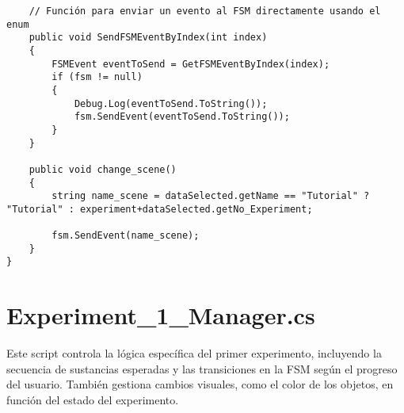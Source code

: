\begin{verbatim}
    // Función para enviar un evento al FSM directamente usando el enum
    public void SendFSMEventByIndex(int index)
    {
        FSMEvent eventToSend = GetFSMEventByIndex(index);
        if (fsm != null)
        {
            Debug.Log(eventToSend.ToString());
            fsm.SendEvent(eventToSend.ToString());
        }
    }

    public void change_scene()
    {
        string name_scene = dataSelected.getName == "Tutorial" ? "Tutorial" : experiment+dataSelected.getNo_Experiment;

        fsm.SendEvent(name_scene);
    }
}
\end{verbatim}
\newpage
\section{Experiment\_1\_Manager.cs}\label{script:Experiment1Manager}
Este script controla la lógica específica del primer experimento, incluyendo la secuencia de sustancias esperadas y las transiciones en la FSM según el progreso del usuario. También gestiona cambios visuales, como el color de los objetos, en función del estado del experimento.
